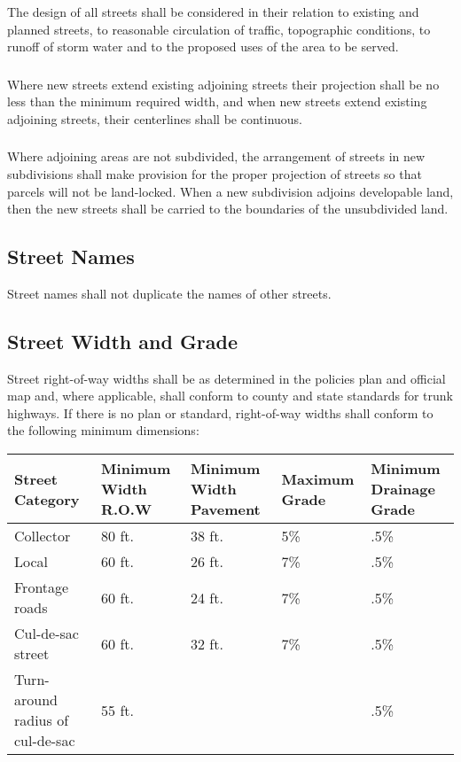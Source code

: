 \subsubsection{}
The design of all streets shall be considered in their relation to existing and planned streets, to reasonable circulation of traffic, topographic conditions, to runoff of storm water and to the proposed uses of the area to be served.
\subsubsection{}
Where new streets extend existing adjoining streets their projection shall be no less than the minimum required width, and when new streets extend existing adjoining streets, their centerlines shall be continuous.
\subsubsection{}
Where adjoining areas are not subdivided, the arrangement of streets in new subdivisions shall make provision for the proper projection of streets so that parcels will not be land-locked.  When a new subdivision adjoins developable land, then the new streets shall be carried to the boundaries of the unsubdivided land.
\subsection{Street Names}
Street names shall not duplicate the names of other streets.
\subsection{Street Width and Grade}
Street right-of-way widths shall be as determined in the policies plan and official map and, where applicable, shall conform to county and state standards for trunk highways.  If there is no plan or standard, right-of-way widths shall conform to the following minimum dimensions:\\
\begin{center}
\begin{tabular}{|p{2.5cm}|p{2.5cm}|p{2.5cm}|p{2.5cm}|p{2.5cm}|}
    \hline
    \textbf{Street Category} & \textbf{Minimum Width R.O.W} & \textbf{Minimum Width Pavement} & \textbf{Maximum Grade} & \textbf{Minimum Drainage Grade}\\
    \hline
    Collector & 80 ft. & 38 ft. & 5\% & .5\%\\
    \hline
    Local & 60 ft. & 26 ft. & 7\% & .5\%\\
    \hline
    Frontage roads & 60 ft. & 24 ft. & 7\% & .5\%\\
    \hline
    Cul-de-sac street & 60 ft. & 32 ft. & 7\% & .5\%\\
    \hline
    Turn-around radius of cul-de-sac & 55 ft. & & & .5\%\\
    \hline
\end{tabular}
\end{center}
